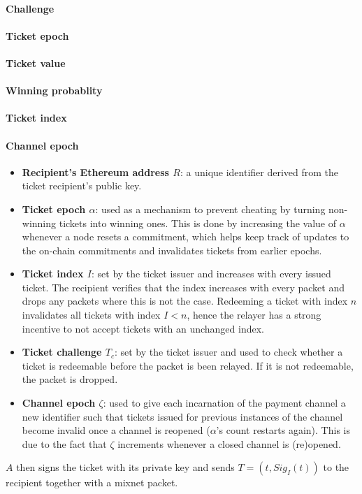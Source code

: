 \paragraph{Challenge}
\label{sec:tickets:issuance:challenge}

\paragraph{Ticket epoch}
\label{sec:tickets:issuance:ticketepoch}

\paragraph{Ticket value}
\label{sec:tickets:issuance:ticketvalue}

\paragraph{Winning probablity}
\label{sec:tickets:issuance:winningprobability}

\paragraph{Ticket index}
\label{sec:tickets:issuance:ticketindex}

\paragraph{Channel epoch}
\label{sec:tickets:issuance:channelepoch}

\begin{itemize}
    \item
          \textbf{Recipient's Ethereum address $R$}: a unique identifier derived from the ticket recipient's public key.
    \item
          \textbf{Ticket epoch $\alpha$}: used as a mechanism to prevent cheating by turning non-winning tickets into winning ones. This is done by increasing the value of $\alpha$ whenever a node resets a commitment, which helps keep track of updates to the on-chain commitments and invalidates tickets from earlier epochs.
    \item
          \textbf{Ticket index $I$}: set by the ticket issuer and increases with every issued ticket. The recipient verifies that the index increases with every packet and drops any packets where this is not the case. Redeeming a ticket with index $n$ invalidates all tickets with index $I<n$, hence the relayer has a strong incentive to not accept tickets with an unchanged index.
    \item
          \textbf{Ticket challenge $T_c$}: set by the ticket issuer and used to check whether a ticket is redeemable before the packet is been relayed. If it is not redeemable, the packet is dropped.
    \item
          \textbf{Channel epoch $\zeta$}: used to give each incarnation of the payment channel a new identifier such that tickets issued for previous instances of the channel become invalid once a channel is reopened ($\alpha$'s count restarts again). This is due to the fact that $\zeta$ increments whenever a closed channel is (re)opened.
\end{itemize}

$A$ then signs the ticket with its private key and sends $T = (t, Sig_I(t))$ to the recipient together with a mixnet packet.